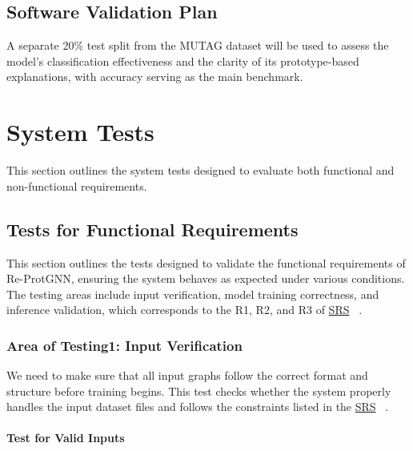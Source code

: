 \documentclass[12pt, titlepage]{article}
\begin{document}
\subsection{Software Validation Plan}
\label{sec:svp}
A separate 20\% test split from the MUTAG dataset will be used to assess the model’s classification effectiveness and the clarity of its prototype-based explanations, with accuracy serving as the main benchmark.

\section{System Tests}
\label{sec:system-tests}
This section outlines the system tests designed to evaluate both functional and non-functional requirements.

\subsection{Tests for Functional Requirements}
\label{sub:FR}
This section outlines the tests designed to validate the functional requirements of Re-ProtGNN, ensuring the system behaves as expected under various conditions. The testing areas include input verification, model training correctness, and inference validation, which corresponds to the R1, R2, and R3 of \href{https://github.com/Yuanqi-X/Re-ProtGNN/blob/main/docs/SRS/SRS.pdf}{SRS} ~\citep{Yuanqi_ReProtGNN_SRS}.

\subsubsection{Area of Testing1: Input Verification}

We need to make sure that all input graphs follow the correct format and structure before training begins. This test checks whether the system properly handles the input dataset files and follows the constraints listed in the \href{https://github.com/Yuanqi-X/Re-ProtGNN/blob/main/docs/SRS/SRS.pdf}{SRS} ~\citep{Yuanqi_ReProtGNN_SRS}.
		
\paragraph{Test for Valid Inputs}
\end{document}

